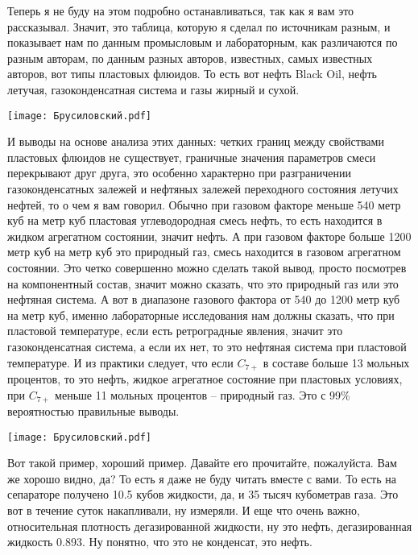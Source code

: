 \documentclass[main.tex]{subfiles}
\begin{document}
Теперь я не буду на этом подробно останавливаться, так как я вам это рассказывал.
Значит, это таблица, которую я сделал по источникам разным, и показывает нам по данным промысловым и лабораторным, как различаются по разным авторам, по данным разных авторов, известных, самых известных авторов, вот типы пластовых флюидов.
То есть вот нефть Black Oil, нефть летучая, газоконденсатная система и газы жирный и сухой.

\begin{center}
\texttt{[image: Брусиловский.pdf]}
\end{center}

И выводы на основе анализа этих данных: четких границ между свойствами пластовых флюидов не существует, граничные значения параметров смеси перекрывают друг друга, это особенно характерно при разграничении газоконденсатных залежей и нефтяных залежей переходного состояния летучих нефтей, то о чем я вам говорил.
Обычно при газовом факторе меньше 540 метр куб на метр куб пластовая углеводородная смесь нефть, то есть находится в жидком агрегатном состоянии, значит нефть.
А при газовом факторе больше 1200 метр куб на метр куб это природный газ, смесь находится в газовом агрегатном состоянии.
Это четко совершенно можно сделать такой вывод, просто посмотрев на компонентный состав, значит можно сказать, что это природный газ или это нефтяная система.
А вот в диапазоне газового фактора от 540 до 1200 метр куб на метр куб, именно лабораторные исследования нам должны сказать, что при пластовой температуре, если есть ретроградные явления, значит это газоконденсатная система, а если их нет, то это нефтяная система при пластовой температуре.
И из практики следует, что если $C_{7+}$ в составе больше 13 мольных процентов, то это нефть, жидкое агрегатное состояние при пластовых условиях, при $C_{7+}$ меньше 11 мольных процентов -- природный газ.
Это с 99\% вероятностью правильные выводы.

\begin{center}
\texttt{[image: Брусиловский.pdf]}
\end{center}

Вот такой пример, хороший пример.
Давайте его прочитайте, пожалуйста.
Вам же хорошо видно, да?
То есть я даже не буду читать вместе с вами.
То есть на сепараторе получено 10.5 кубов жидкости, да, и 35 тысяч кубометрав газа.
Это вот в течение суток накапливали, ну измеряли.
И еще что очень важно, относительная плотность дегазированной жидкости, ну это нефть, дегазированная жидкость 0.893.
Ну понятно, что это не конденсат, это нефть.
\end{document}
